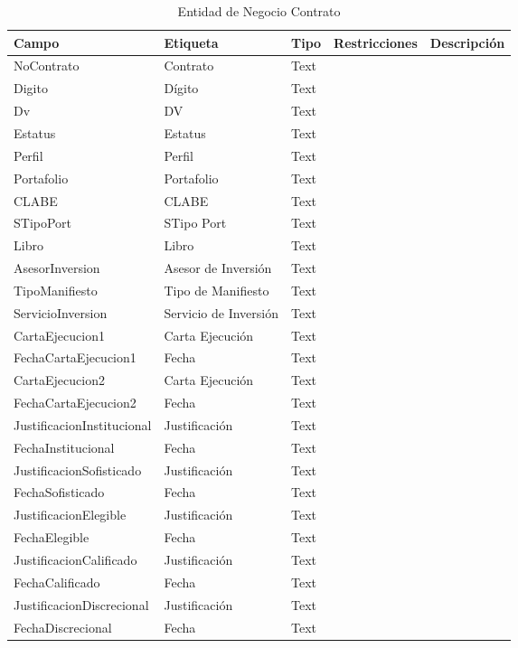 \begin{table}[H]
	\caption{Entidad de Negocio Contrato}
	\label{tab:fields-dom-Contrato}
	\begin{center}
	\begin{tabularx}{0.90\linewidth}{ X X X X X }
		\hline
		\textbf{Campo} &
		\textbf{Etiqueta} &
		\textbf{Tipo} &
		\textbf{Restricciones} &
		\textbf{Descripci\'on} \\
		\hline
		NoContrato &
		Contrato &
		Text &
		 &
		 \\
		Digito &
		D\'igito &
		Text &
		 &
		 \\
		Dv &
		DV &
		Text &
		 &
		 \\
		Estatus &
		Estatus &
		Text &
		 &
		 \\
		Perfil &
		Perfil &
		Text &
		 &
		 \\
		Portafolio &
		Portafolio &
		Text &
		 &
		 \\
		CLABE &
		CLABE &
		Text &
		 &
		 \\
		STipoPort &
		STipo Port &
		Text &
		 &
		 \\
		Libro &
		Libro &
		Text &
		 &
		 \\
		AsesorInversion &
		Asesor de Inversi\'on &
		Text &
		 &
		 \\
		TipoManifiesto &
		Tipo de Manifiesto &
		Text &
		 &
		 \\
		ServicioInversion &
		Servicio de Inversi\'on &
		Text &
		 &
		 \\
		CartaEjecucion1 &
		Carta Ejecuci\'on &
		Text &
		 &
		 \\
		FechaCartaEjecucion1 &
		Fecha &
		Text &
		 &
		 \\
		CartaEjecucion2 &
		Carta Ejecuci\'on &
		Text &
		 &
		 \\
		FechaCartaEjecucion2 &
		Fecha &
		Text &
		 &
		 \\
		JustificacionInstitucional &
		Justificaci\'on &
		Text &
		 &
		 \\
		FechaInstitucional &
		Fecha &
		Text &
		 &
		 \\
		JustificacionSofisticado &
		Justificaci\'on &
		Text &
		 &
		 \\
		FechaSofisticado &
		Fecha &
		Text &
		 &
		 \\
		JustificacionElegible &
		Justificaci\'on &
		Text &
		 &
		 \\
		FechaElegible &
		Fecha &
		Text &
		 &
		 \\
		JustificacionCalificado &
		Justificaci\'on &
		Text &
		 &
		 \\
		FechaCalificado &
		Fecha &
		Text &
		 &
		 \\
		JustificacionDiscrecional &
		Justificaci\'on &
		Text &
		 &
		 \\
		FechaDiscrecional &
		Fecha &
		Text &
		 &
		 \\
		\hline
	\end{tabularx}
	\end{center}
\end{table}
